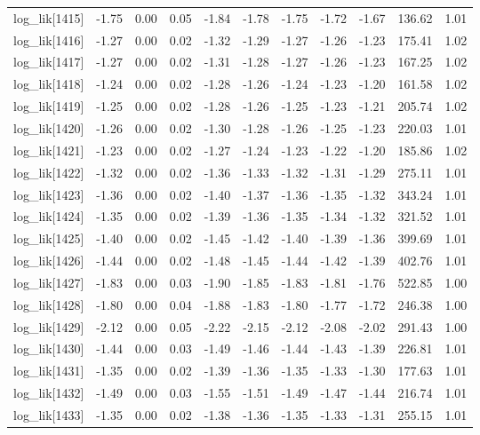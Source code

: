 \begin{table}[ht]
\begin{tabular}{rrrrrrrrrrr}
  log\_lik[1415] & -1.75 & 0.00 & 0.05 & -1.84 & -1.78 & -1.75 & -1.72 & -1.67 & 136.62 & 1.01 \\ 
  log\_lik[1416] & -1.27 & 0.00 & 0.02 & -1.32 & -1.29 & -1.27 & -1.26 & -1.23 & 175.41 & 1.02 \\ 
  log\_lik[1417] & -1.27 & 0.00 & 0.02 & -1.31 & -1.28 & -1.27 & -1.26 & -1.23 & 167.25 & 1.02 \\ 
  log\_lik[1418] & -1.24 & 0.00 & 0.02 & -1.28 & -1.26 & -1.24 & -1.23 & -1.20 & 161.58 & 1.02 \\ 
  log\_lik[1419] & -1.25 & 0.00 & 0.02 & -1.28 & -1.26 & -1.25 & -1.23 & -1.21 & 205.74 & 1.02 \\ 
  log\_lik[1420] & -1.26 & 0.00 & 0.02 & -1.30 & -1.28 & -1.26 & -1.25 & -1.23 & 220.03 & 1.01 \\ 
  log\_lik[1421] & -1.23 & 0.00 & 0.02 & -1.27 & -1.24 & -1.23 & -1.22 & -1.20 & 185.86 & 1.02 \\ 
  log\_lik[1422] & -1.32 & 0.00 & 0.02 & -1.36 & -1.33 & -1.32 & -1.31 & -1.29 & 275.11 & 1.01 \\ 
  log\_lik[1423] & -1.36 & 0.00 & 0.02 & -1.40 & -1.37 & -1.36 & -1.35 & -1.32 & 343.24 & 1.01 \\ 
  log\_lik[1424] & -1.35 & 0.00 & 0.02 & -1.39 & -1.36 & -1.35 & -1.34 & -1.32 & 321.52 & 1.01 \\ 
  log\_lik[1425] & -1.40 & 0.00 & 0.02 & -1.45 & -1.42 & -1.40 & -1.39 & -1.36 & 399.69 & 1.01 \\ 
  log\_lik[1426] & -1.44 & 0.00 & 0.02 & -1.48 & -1.45 & -1.44 & -1.42 & -1.39 & 402.76 & 1.01 \\ 
  log\_lik[1427] & -1.83 & 0.00 & 0.03 & -1.90 & -1.85 & -1.83 & -1.81 & -1.76 & 522.85 & 1.00 \\ 
  log\_lik[1428] & -1.80 & 0.00 & 0.04 & -1.88 & -1.83 & -1.80 & -1.77 & -1.72 & 246.38 & 1.00 \\ 
  log\_lik[1429] & -2.12 & 0.00 & 0.05 & -2.22 & -2.15 & -2.12 & -2.08 & -2.02 & 291.43 & 1.00 \\ 
  log\_lik[1430] & -1.44 & 0.00 & 0.03 & -1.49 & -1.46 & -1.44 & -1.43 & -1.39 & 226.81 & 1.01 \\ 
  log\_lik[1431] & -1.35 & 0.00 & 0.02 & -1.39 & -1.36 & -1.35 & -1.33 & -1.30 & 177.63 & 1.01 \\ 
  log\_lik[1432] & -1.49 & 0.00 & 0.03 & -1.55 & -1.51 & -1.49 & -1.47 & -1.44 & 216.74 & 1.01 \\ 
  log\_lik[1433] & -1.35 & 0.00 & 0.02 & -1.38 & -1.36 & -1.35 & -1.33 & -1.31 & 255.15 & 1.01 \\ 

\end{tabular}
\end{table}
